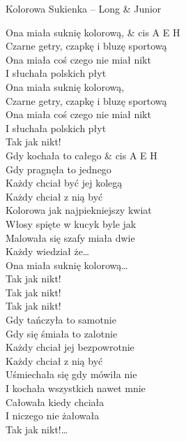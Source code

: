 \begin{piosenka}{Kolorowa Sukienka -- Long \& Junior}

 Ona miała suknię kolorową, & cis A E H \\
 Czarne getry, czapkę i bluzę sportową \\
 Ona miała coś czego nie miał nikt \\
 I słuchała polskich płyt \\
 Ona miała suknię kolorową, \\
 Czarne getry, czapkę i bluzę sportową \\
 Ona miała coś czego nie miał nikt \\
 I słuchała polskich płyt \\
 Tak jak nikt! \\[\zwrotkaspace]

Gdy kochała to całego & cis A E H \\
Gdy pragnęła to jednego \\
Każdy chciał być jej kolegą \\
Każdy chciał z nią być \\
Kolorowa jak najpiekniejszy kwiat \\
Włosy spięte w kucyk byle jak \\
Malowała się szafy miała dwie \\
Każdy wiedział że\ldots \\[\zwrotkaspace]

 Ona miała suknię kolorową\ldots \\[\zwrotkaspace]

 Tak jak nikt! \\
 Tak jak nikt! \\
 Tak jak nikt! \\[\zwrotkaspace]

Gdy tańczyła to samotnie \\
Gdy się śmiała to zalotnie \\
Każdy chciał jej bezpowrotnie \\
Każdy chciał z nią być \\
Uśmiechała się gdy mówiła nie \\
I kochała wszystkich nawet mnie \\
Całowała kiedy chciała \\
I niczego nie żałowała \\[\zwrotkaspace]

 Tak jak nikt!\ldots \\[\zwrotkaspace]

\end{piosenka}